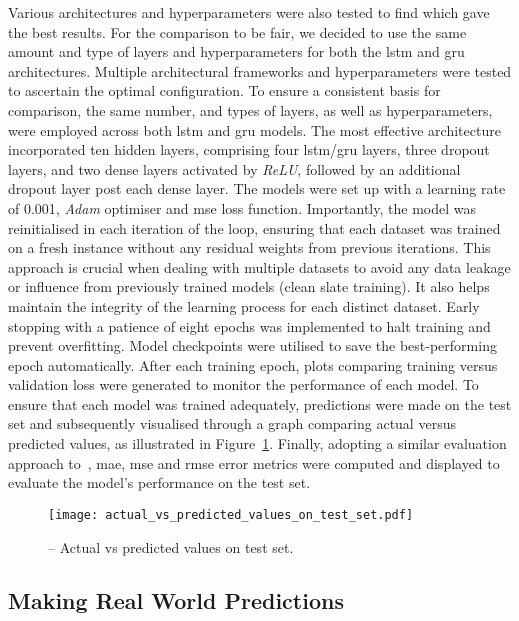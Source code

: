 Various architectures and hyperparameters were also tested to find which gave the best results. For the comparison to be fair, we decided to use the same amount and type of layers and hyperparameters for both the \acrshort{lstm} and \acrshort{gru} architectures. Multiple architectural frameworks and hyperparameters were tested to ascertain the optimal configuration. To ensure a consistent basis for comparison, the same number, and types of layers, as well as hyperparameters, were employed across both \acrshort{lstm} and \acrshort{gru} models. The most effective architecture incorporated ten hidden layers, comprising four \acrshort{lstm}/\acrshort{gru} layers, three dropout layers, and two dense layers activated by \textit{ReLU}, followed by an additional dropout layer post each dense layer. The models were set up with a learning rate of 0.001, \textit{Adam} optimiser and \acrshort{mse} loss function. Importantly, the model was reinitialised in each iteration of the loop, ensuring that each dataset was trained on a fresh instance without any residual weights from previous iterations. This approach is crucial when dealing with multiple datasets to avoid any data leakage or influence from previously trained models (clean slate training). It also helps maintain the integrity of the learning process for each distinct dataset. Early stopping with a patience of eight epochs was implemented to halt training and prevent overfitting. Model checkpoints were utilised to save the best-performing epoch automatically. After each training epoch, plots comparing training versus validation loss were generated to monitor the performance of each model. To ensure that each model was trained adequately, predictions were made on the test set and subsequently visualised through a graph comparing actual versus predicted values, as illustrated in Figure~\ref{fig_3.6}. Finally, adopting a similar evaluation approach to~\cite{23}, \acrshort{mae}, \acrshort{mse} and \acrshort{rmse} error metrics were computed and displayed to evaluate the model's performance on the test set.

\begin{figure}[htbp]
    \centering
    \texttt{[image: actual\_vs\_predicted\_values\_on\_test\_set.pdf]}
    \caption[Actual vs predicted values on test set.]{-- Actual vs predicted values on test set.\label{fig_3.6}}
\end{figure}

\subsection{Making Real World Predictions}
\label{subsec:3.3.3}

